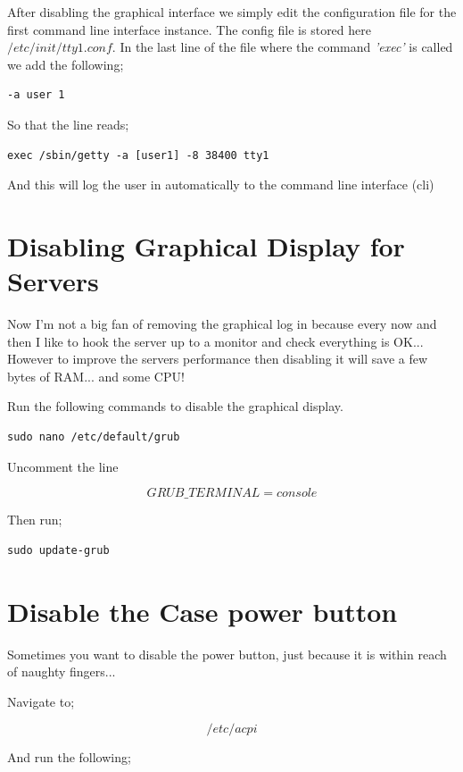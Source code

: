 After disabling the graphical interface we simply edit the configuration file for the first command line interface instance. The config file is stored here $/etc/init/tty1.conf$.  In the last line of the file where the command \textit{'exec'} is called we add the following;

\begin{lstlisting}
-a user 1
\end{lstlisting}

So that the line reads;

\begin{lstlisting}
exec /sbin/getty -a [user1] -8 38400 tty1
\end{lstlisting}

And this will log the user in automatically to the command line interface (cli)

\section{Disabling Graphical Display for Servers}

Now I'm not a big fan of removing the graphical log in because every now and then I like to hook the server up to a monitor and check everything is OK...  However to improve the servers performance then disabling it will save a few bytes of RAM... and some CPU!

Run the following commands to disable the graphical display.

\begin{lstlisting}
sudo nano /etc/default/grub
\end{lstlisting}

Uncomment the line

$$GRUB\_TERMINAL=console$$

Then run;

\begin{lstlisting}
sudo update-grub
\end{lstlisting}

\section{Disable the Case power button}

Sometimes you want to disable the power button, just because it is within reach of naughty fingers...


Navigate to;

$$
/etc/acpi
$$

And run the following;

